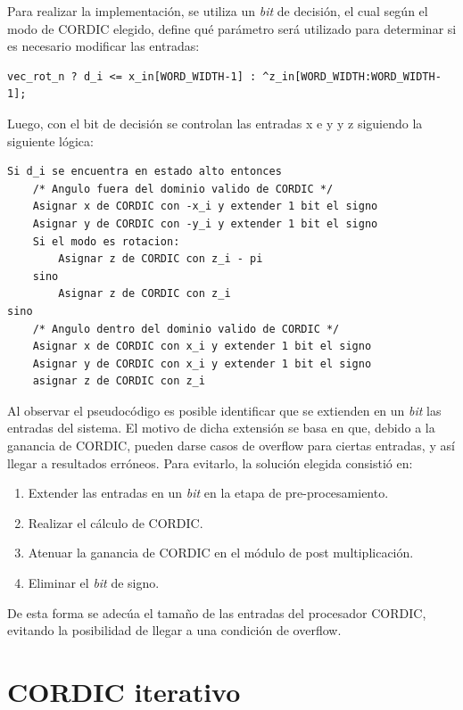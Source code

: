 Para realizar la implementación, se utiliza un \textit{bit} de decisión, el cual según el modo de CORDIC elegido, define qué parámetro será utilizado para determinar si es necesario modificar las entradas:

\begin{lstlisting}[style=C]
vec_rot_n ? d_i <= x_in[WORD_WIDTH-1] : ^z_in[WORD_WIDTH:WORD_WIDTH-1];
\end{lstlisting}

Luego, con el bit de decisión se controlan las entradas x e y y z siguiendo la siguiente lógica:

\begin{lstlisting}[style=C]
Si d_i se encuentra en estado alto entonces
	/* Angulo fuera del dominio valido de CORDIC */
	Asignar x de CORDIC con -x_i y extender 1 bit el signo
	Asignar y de CORDIC con -y_i y extender 1 bit el signo
	Si el modo es rotacion:
		Asignar z de CORDIC con z_i - pi
	sino
		Asignar z de CORDIC con z_i
sino
	/* Angulo dentro del dominio valido de CORDIC */
	Asignar x de CORDIC con x_i y extender 1 bit el signo
	Asignar y de CORDIC con x_i y extender 1 bit el signo
	asignar z de CORDIC con z_i
\end{lstlisting}

Al observar el pseudocódigo es posible identificar que se extienden en un \textit{bit} las entradas del sistema. El motivo de dicha extensión se basa en que, debido a la ganancia de CORDIC, pueden darse casos de overflow para ciertas entradas, y así llegar a resultados erróneos. Para evitarlo, la solución elegida consistió en:

\begin{enumerate}
	\item Extender las entradas en un \textit{bit} en la etapa de pre-procesamiento.
	\item Realizar el cálculo de CORDIC.
	\item Atenuar la ganancia de CORDIC en el módulo de post multiplicación.
	\item Eliminar el \textit{bit} de signo.
\end{enumerate}

De esta forma se adecúa el tamaño de las entradas del procesador CORDIC, evitando la posibilidad de llegar a una condición de overflow.

\section{CORDIC iterativo}

